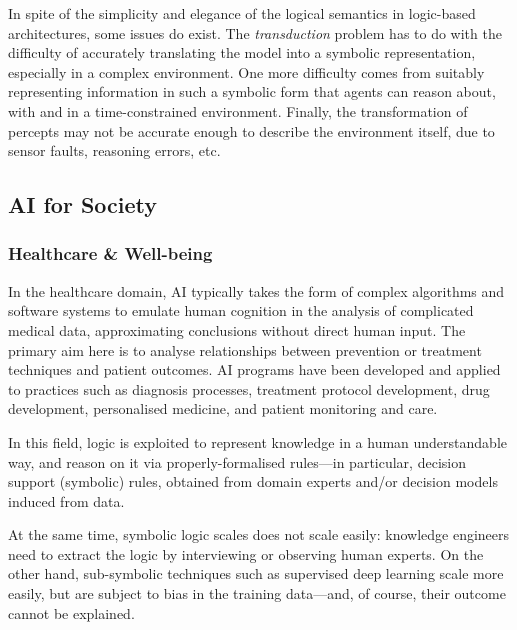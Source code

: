 \documentclass[12pt,a4paper,openright,twoside]{book}
\begin{document}
In spite of the simplicity and elegance of the logical semantics in logic-based architectures, some issues do exist.
%
The \emph{transduction} problem \cite{bie2004} has to do with the difficulty of accurately translating the model into a symbolic representation, especially in a complex environment.
%
One more difficulty comes from suitably representing information in such a symbolic form that agents can reason about, with and in a time-constrained environment.
%
Finally, the transformation of percepts may not be accurate enough to describe the environment itself, due to sensor faults, reasoning errors, etc.

\subsection{AI for Society}\label{ssec:ai-society}

\subsubsection{Healthcare \& Well-being}

In the healthcare domain, AI typically takes the form of complex algorithms and software systems to emulate human cognition in the analysis of complicated medical data, approximating conclusions without direct human input.
%
The primary aim here is to analyse relationships between prevention or treatment techniques and patient outcomes.
%
AI programs have been developed and applied to practices such as diagnosis processes, treatment protocol development, drug development, personalised medicine, and patient monitoring and care.

In this field, logic is exploited to represent knowledge in a human understandable way, and reason on it via properly-formalised rules---in particular, decision support (symbolic) rules, obtained from domain experts and/or decision models induced from data.

At the same time, symbolic logic scales does not scale easily: knowledge engineers need to extract the logic by interviewing or observing human experts.
%
On the other hand, sub-symbolic techniques such as supervised deep learning scale more easily, but are subject to bias in the training data---and, of course, their outcome cannot be explained.
\end{document}
